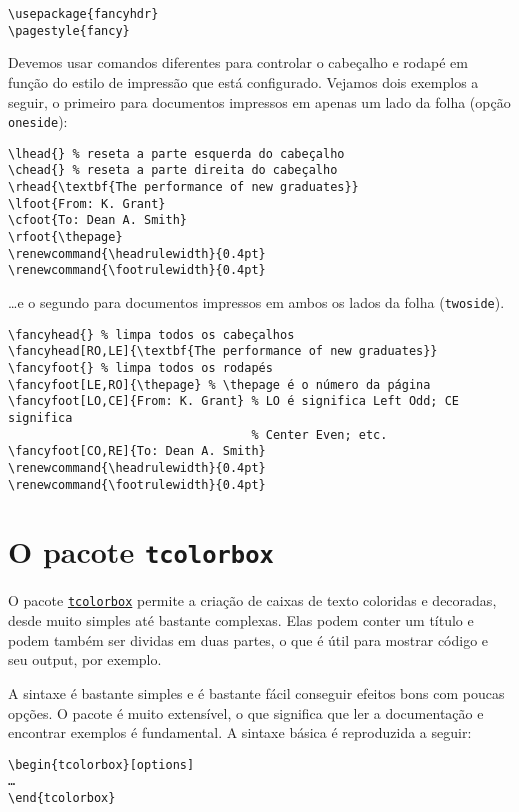 \documentclass[a4paper]{article}
\newcommand{\code}[1]{\texttt{#1}}
\begin{document}
\begin{verbatim}
\usepackage{fancyhdr}
\pagestyle{fancy}
\end{verbatim}

Devemos usar comandos diferentes para controlar o cabeçalho e rodapé em função
do estilo de impressão que está configurado. Vejamos dois exemplos a seguir, o
primeiro para documentos impressos em apenas um lado da folha (opção
\code{oneside}):

\begin{verbatim}
\lhead{} % reseta a parte esquerda do cabeçalho
\chead{} % reseta a parte direita do cabeçalho
\rhead{\textbf{The performance of new graduates}}
\lfoot{From: K. Grant}
\cfoot{To: Dean A. Smith}
\rfoot{\thepage}
\renewcommand{\headrulewidth}{0.4pt}
\renewcommand{\footrulewidth}{0.4pt}
\end{verbatim}

…e o segundo para documentos impressos em ambos os lados da folha
(\code{twoside}).

\begin{verbatim}
\fancyhead{} % limpa todos os cabeçalhos
\fancyhead[RO,LE]{\textbf{The performance of new graduates}}
\fancyfoot{} % limpa todos os rodapés
\fancyfoot[LE,RO]{\thepage} % \thepage é o número da página
\fancyfoot[LO,CE]{From: K. Grant} % LO é significa Left Odd; CE significa
                                  % Center Even; etc.
\fancyfoot[CO,RE]{To: Dean A. Smith}
\renewcommand{\headrulewidth}{0.4pt}
\renewcommand{\footrulewidth}{0.4pt}
\end{verbatim}

\section{O pacote \code{tcolorbox}}

O pacote \href{https://www.ctan.org/pkg/tcolorbox}{\code{tcolorbox}} permite a
criação de caixas de texto coloridas e decoradas, desde muito simples até
bastante complexas. Elas podem conter um título e podem também ser dividas em
duas partes, o que é útil para mostrar código e seu output, por exemplo.

A sintaxe é bastante simples e é bastante fácil conseguir efeitos bons com
poucas opções. O pacote é muito extensível, o que significa que ler a
documentação e encontrar exemplos é fundamental. A sintaxe básica é reproduzida
a seguir:

\begin{verbatim}
\begin{tcolorbox}[options]
…
\end{tcolorbox}
\end{verbatim}
\end{document}
